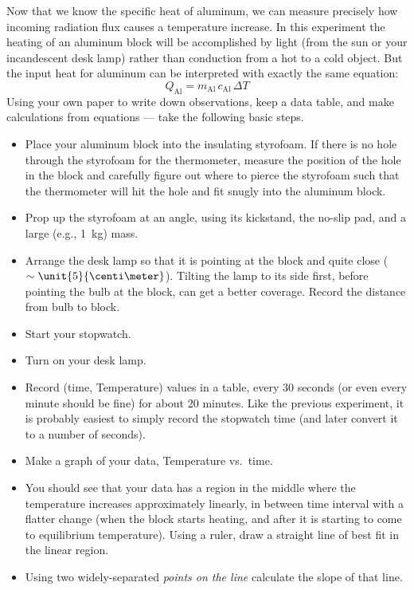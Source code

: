 Now that we know the specific heat of aluminum, we can measure precisely how incoming radiation flux causes a temperature increase.  In this experiment the heating of an aluminum block will be accomplished by light (from the sun or your incandescent desk lamp) rather than conduction from a hot to a cold object. But the input heat for aluminum can be interpreted with exactly the same equation:
	\begin{equation*}
	Q_\text{Al} = m_\text{Al} \, c_\text{Al} \, \Delta T
	\end{equation*}
 Using your own paper to write down observations, keep a data table, and make calculations from equations --- take the following basic steps.
	\begin{itemize}
	\item Place your aluminum block into the insulating styrofoam.  If there is no hole through the styrofoam for the thermometer, measure the position of the hole in the block and carefully figure out where to pierce the styrofoam such that the thermometer will hit the hole and fit snugly into the aluminum block.
	\item Prop up the styrofoam at an angle, using its kickstand, the no-slip pad, and a large (e.g., 1~kg) mass.
	\item Arrange the desk lamp so that it is pointing at the block and quite close ($\sim \unit{5}{\centi\meter}$). Tilting the lamp to its side first, before pointing the bulb at the block, can get a better coverage. Record the distance from bulb to block.
	\item Start your stopwatch.
	\item Turn on your desk lamp.
	\item Record (time, Temperature) values in a table, every 30 seconds (or even every minute should be fine) for about 20 minutes.  Like the previous experiment, it is probably easiest to simply record the stopwatch time (and later convert it to a number of seconds).
	\item Make a graph of your data, Temperature vs.\ time.
	\item You should see that your data has a region in the middle where the temperature increases approximately linearly, in between time interval with a flatter change (when the block starts heating, and after it is starting to come to equilibrium temperature). Using a ruler, draw a straight line of best fit in the linear region.  
	\item Using two widely-separated {\em points on the line} calculate the slope of that line.

\end{itemize}
